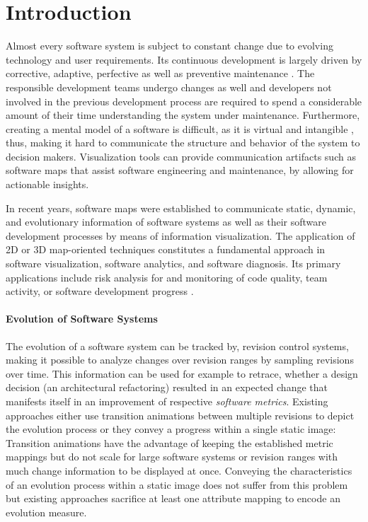 
\section{Introduction}
\label{sec:introduction}

\noindent 
Almost every software system is subject to constant change due to evolving technology and user requirements. 
Its continuous development is largely driven by corrective, adaptive, perfective as well as preventive maintenance \cite{Lientz1980}.
The responsible development teams undergo changes as well and developers not involved in the previous development process are required to spend a considerable amount of their time understanding the system under maintenance. 
Furthermore, creating a mental model of a software is difficult, as it is virtual and intangible \cite{Knight2000}, thus, making it hard to communicate the structure and behavior of the system to decision makers. 
Visualization tools can provide communication artifacts such as software maps that assist software engineering and maintenance, \eg by allowing for actionable insights.

In recent years, software maps were established to communicate static, dynamic, and evolutionary information of software systems as well as their software development processes by means of information visualization. 
The application of 2D or 3D map-oriented techniques constitutes a fundamental approach in software visualization, software analytics, and software diagnosis.
Its primary applications include risk analysis for and monitoring of code quality, team activity, or software development progress \cite{Bohnet2011}.

\paragraph*{Evolution of Software Systems}
\noindent
The evolution of a software system can be tracked by, \eg revision control systems, making it possible to analyze changes over revision ranges by sampling revisions over time.
This information can be used for example to retrace, whether a design decision (\eg an architectural refactoring) resulted in an expected change that manifests itself in an improvement of respective \emph{software metrics}.
Existing approaches either use transition animations between multiple revisions to depict the evolution process or they convey a progress within a single static image:
Transition animations have the advantage of keeping the established metric mappings but do not scale for large software systems or revision ranges with much change information to be displayed at once.
Conveying the characteristics of an evolution process within a static image does not suffer from this problem but existing approaches sacrifice at least one attribute mapping to encode an evolution measure.

